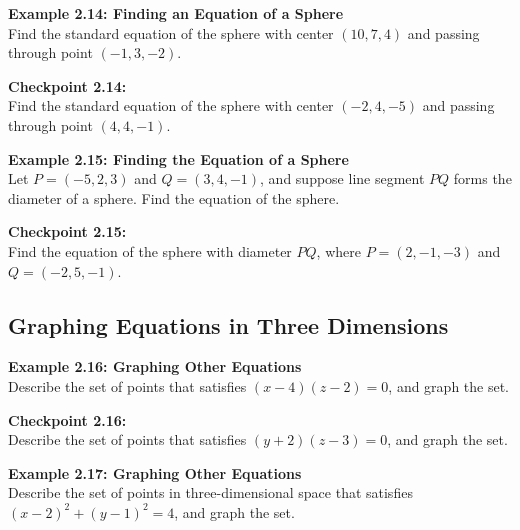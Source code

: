 \documentclass{article}
\begin{document}
\begin{examplebox}
    \textbf{Example 2.14: Finding an Equation of a Sphere} \\
    Find the standard equation of the sphere with center \((10, 7, 4)\) and passing through point \((-1, 3, -2)\).
\end{examplebox}

\begin{exercisebox}
    \textbf{Checkpoint 2.14:} \\
    Find the standard equation of the sphere with center \((-2, 4, -5)\) and passing through point \((4, 4, -1)\).
\end{exercisebox}

\begin{examplebox}
    \textbf{Example 2.15: Finding the Equation of a Sphere} \\
    Let \(P = (-5, 2, 3)\) and \(Q = (3, 4, -1)\), and suppose line segment \(PQ\) forms the diameter of a sphere. Find the equation of the sphere.
\end{examplebox}

\begin{exercisebox}
    \textbf{Checkpoint 2.15:} \\
    Find the equation of the sphere with diameter \(PQ\), where \(P = (2, -1, -3)\) and \(Q = (-2, 5, -1)\).
\end{exercisebox}

\subsection*{Graphing Equations in Three Dimensions}

\begin{examplebox}
    \textbf{Example 2.16: Graphing Other Equations} \\
    Describe the set of points that satisfies \((x - 4)(z - 2) = 0\), and graph the set.
\end{examplebox}

\begin{exercisebox}
    \textbf{Checkpoint 2.16:} \\
    Describe the set of points that satisfies \((y + 2)(z - 3) = 0\), and graph the set.
\end{exercisebox}

\begin{examplebox}
    \textbf{Example 2.17: Graphing Other Equations} \\
    Describe the set of points in three-dimensional space that satisfies \((x - 2)^2 + (y - 1)^2 = 4\), and graph the set.
\end{examplebox}
\end{document}
